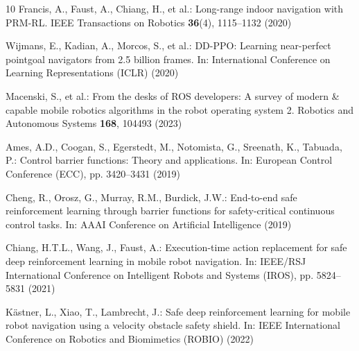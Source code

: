\documentclass[runningheads]{llncs}
\begin{document}
\begin{thebibliography}{10}
Francis, A., Faust, A., Chiang, H., et al.: Long-range indoor navigation with PRM-RL. IEEE Transactions on Robotics \textbf{36}(4), 1115--1132 (2020)

Wijmans, E., Kadian, A., Morcos, S., et al.: DD-PPO: Learning near-perfect pointgoal navigators from 2.5 billion frames. In: International Conference on Learning Representations (ICLR) (2020)

Macenski, S., et al.: From the desks of ROS developers: A survey of modern \& capable mobile robotics algorithms in the robot operating system 2. Robotics and Autonomous Systems \textbf{168}, 104493 (2023)

Ames, A.D., Coogan, S., Egerstedt, M., Notomista, G., Sreenath, K., Tabuada, P.: Control barrier functions: Theory and applications. In: European Control Conference (ECC), pp. 3420--3431 (2019)

Cheng, R., Orosz, G., Murray, R.M., Burdick, J.W.: End-to-end safe reinforcement learning through barrier functions for safety-critical continuous control tasks. In: AAAI Conference on Artificial Intelligence (2019)

Chiang, H.T.L., Wang, J., Faust, A.: Execution-time action replacement for safe deep reinforcement learning in mobile robot navigation. In: IEEE/RSJ International Conference on Intelligent Robots and Systems (IROS), pp. 5824--5831 (2021)

K{\"a}stner, L., Xiao, T., Lambrecht, J.: Safe deep reinforcement learning for mobile robot navigation using a velocity obstacle safety shield. In: IEEE International Conference on Robotics and Biomimetics (ROBIO) (2022)

\end{thebibliography}
\end{document}
